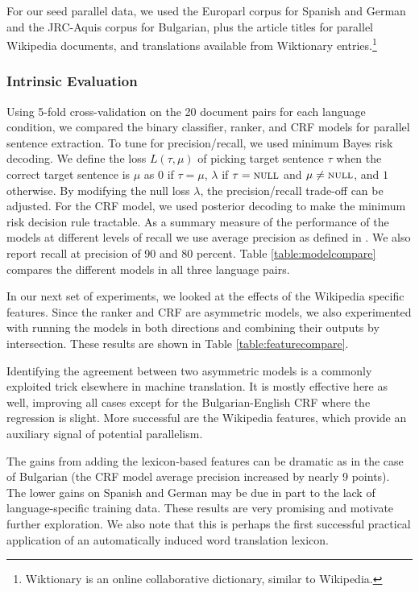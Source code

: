 \documentclass[11pt,letterpaper]{article}
\begin{document}
For our seed parallel data, we used the Europarl corpus
\cite{Koehn05} for Spanish and German and the
JRC-Aquis corpus for Bulgarian, plus the article titles for
parallel Wikipedia documents, and translations available from
Wiktionary entries.\footnote{Wiktionary is an online collaborative
dictionary, similar to Wikipedia.} %

\subsubsection{Intrinsic Evaluation}
Using 5-fold cross-validation on the 20 document pairs for each
language condition, we compared the binary classifier, ranker, and
CRF models for parallel sentence extraction. To tune for 
precision/recall, we used minimum Bayes risk decoding.  We define
the loss $L(\tau,\mu)$ of picking target sentence $\tau$ when the
correct target sentence is $\mu$ as $0$ if $\tau=\mu$, $\lambda$ if
$\tau = \textsc{null}$ and $\mu\ne\textsc{null}$, and $1$ otherwise.
By modifying the null loss $\lambda$, the precision/recall
trade-off can be adjusted.  For the CRF model, we used posterior
decoding to make the minimum risk decision rule tractable. As a
summary measure of the performance of the models at different
levels of recall we use average precision as defined in
\cite{Ido06}. We also report recall at precision of 90 and
80 percent. %
 Table \ref{table:modelcompare} compares the
different models in all three language pairs.

In our next set of experiments, we looked at the effects of the Wikipedia
specific features.  Since the ranker and CRF are asymmetric models,
we also experimented with running the models in both directions and combining
their outputs by intersection.  These results are shown in Table \ref{table:featurecompare}.

Identifying the agreement between two asymmetric models is a commonly
exploited trick elsewhere in machine translation. It is mostly effective
here as well, improving all cases except for the Bulgarian-English CRF where
the regression is slight. More successful are the Wikipedia features, which
provide an auxiliary signal of potential parallelism.

The gains from adding the lexicon-based features can be dramatic
as in the case of Bulgarian (the CRF model average precision
increased by nearly 9 points). The lower gains on Spanish and
German may be due in part to the lack of language-specific
training data. These results are very promising and
motivate further exploration. We also note that this
is perhaps the first successful practical application of an
automatically induced word translation lexicon.
\end{document}
